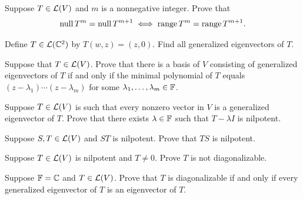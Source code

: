 \begin{exc}
\begin{exercise}
Suppose $T\in\mathcal{L}(V)$ and $m$ is a nonnegative integer. Prove that
\[ \operatorname{null} T^m = \operatorname{null} T^{m+1} \iff \operatorname{range} T^m = \operatorname{range} T^{m+1}. \]
\end{exercise}

\begin{exercise}
Define $T\in\mathcal{L}(\mathbb{C}^2)$ by $T(w,z)=(z,0)$. Find all generalized eigenvectors
of $T$.
\end{exercise}

\begin{exercise}
Suppose that $T\in\mathcal{L}(V)$. Prove that there is a basis of $V$ consisting of
generalized eigenvectors of $T$ if and only if the minimal polynomial of $T$
equals $(z-\lambda_1)\cdots(z-\lambda_m)$ for some
$\lambda_1,\dots,\lambda_m\in\mathbb{F}$.
\end{exercise}

\begin{exercise}
Suppose $T\in\mathcal{L}(V)$ is such that every nonzero vector in $V$ is a
generalized eigenvector of $T$. Prove that there exists $\lambda\in\mathbb{F}$ such
that $T-\lambda I$ is nilpotent.
\end{exercise}

\begin{exercise}
Suppose $S,T\in\mathcal{L}(V)$ and $ST$ is nilpotent. Prove that $TS$ is nilpotent.
\end{exercise}

\begin{exercise}
Suppose $T\in\mathcal{L}(V)$ is nilpotent and $T\ne0$. Prove $T$ is not
diagonalizable.
\end{exercise}

\begin{exercise}
Suppose $\mathbb{F}=\mathbb{C}$ and $T\in\mathcal{L}(V)$. Prove that $T$ is diagonalizable if and only
if every generalized eigenvector of $T$ is an eigenvector of $T$.
\end{exercise}


\end{exc}
